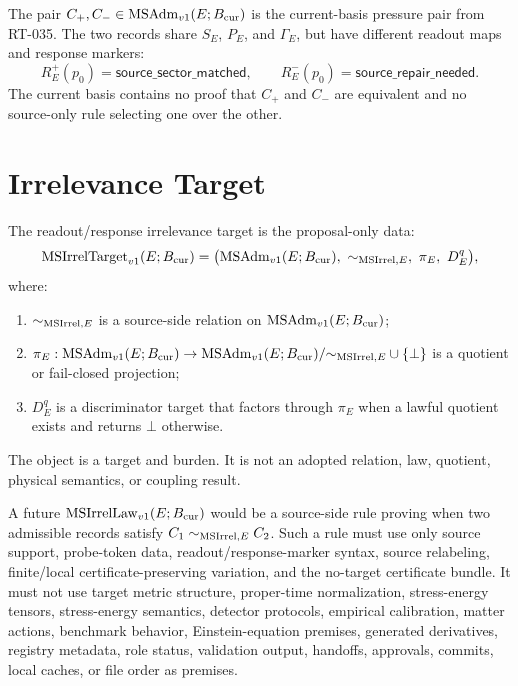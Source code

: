 \begin{definition}
The pair \(C_+,C_-\in\mathrm{MSAdm}_{v1}(E;B_{\mathrm{cur}})\) is the current-basis pressure pair
from RT-035.  The two records share \(S_E\), \(P_E\), and \(\Gamma_E\), but
have different readout maps and response markers:
\[
  R_E^+(p_0)=\mathsf{source\_sector\_matched},\qquad
  R_E^-(p_0)=\mathsf{source\_repair\_needed}.
\]
The current basis contains no proof that \(C_+\) and \(C_-\) are equivalent
and no source-only rule selecting one over the other.
\end{definition}

\section{Irrelevance Target}

\begin{definition}
The readout/response irrelevance target is the proposal-only data:
\[
  \mathrm{MSIrrelTarget}_{v1}(E;B_{\mathrm{cur}})
  =
  \bigl(\mathrm{MSAdm}_{v1}(E;B_{\mathrm{cur}}),\ \sim_{\mathrm{MSIrrel},E},\ \pi_E,\ D^q_E\bigr),
\]
where:
\begin{enumerate}
  \item \(\sim_{\mathrm{MSIrrel},E}\) is a source-side relation on \(\mathrm{MSAdm}_{v1}(E;B_{\mathrm{cur}})\);
  \item \(\pi_E:\mathrm{MSAdm}_{v1}(E;B_{\mathrm{cur}})\to
    \mathrm{MSAdm}_{v1}(E;B_{\mathrm{cur}})/{\sim_{\mathrm{MSIrrel},E}}\cup\{\bot\}\) is a quotient or fail-closed
    projection;
  \item \(D^q_E\) is a discriminator target that factors through \(\pi_E\)
    when a lawful quotient exists and returns \(\bot\) otherwise.
\end{enumerate}
The object is a target and burden.  It is not an adopted relation, law,
quotient, physical semantics, or coupling result.
\end{definition}

\begin{definition}
A future \(\mathrm{MSIrrelLaw}_{v1}(E;B_{\mathrm{cur}})\) would be a source-side rule proving when
two admissible records satisfy \(C_1\sim_{\mathrm{MSIrrel},E} C_2\).  Such a rule must use
only source support, probe-token data, readout/response-marker syntax,
source relabeling, finite/local certificate-preserving variation, and the
no-target certificate bundle.  It must not use target metric structure,
proper-time normalization, stress-energy tensors, stress-energy semantics,
detector protocols, empirical calibration, matter actions, benchmark
behavior, Einstein-equation premises, generated derivatives, registry
metadata, role status, validation output, handoffs, approvals, commits, local
caches, or file order as premises.
\end{definition}

